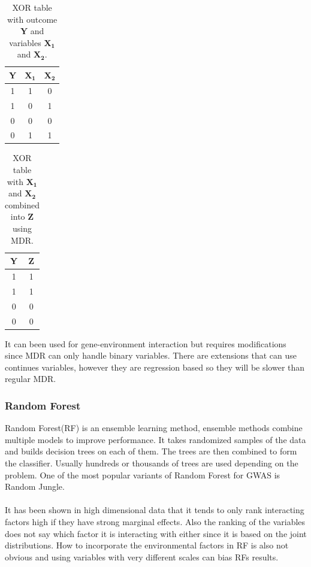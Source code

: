 \documentclass[10pt,a4paper]{article}
\begin{document}
\begin{table}[h]
\begin{tabular}{ | c | c | c | }
  \hline
  \textbf{Y} & $\mathbf{X_1}$ & $\mathbf{X_2}$ \\
  \hline
  1 & 1 & 0 \\
  \hline 
  1 & 0 & 1 \\
  \hline
  0 & 0 & 0 \\
  \hline
  0 & 1 & 1 \\
  \hline
\end{tabular}
\caption{XOR table with outcome $\mathbf{Y}$ and variables $\mathbf{X_1}$ and $\mathbf{X_2}$.}
\label{table:xor_table}
\end{table}
\begin{table}[h]
\begin{tabular}{ | c | c | }
  \hline
  \textbf{Y} & \textbf{Z} \\
  \hline
  1 & 1 \\
  \hline
  1 & 1 \\
  \hline
  0 & 0 \\
  \hline
  0 & 0 \\
  \hline
\end{tabular}
\caption{XOR table with $\mathbf{X_1}$ and $\mathbf{X_2}$ combined into $\mathbf{Z}$ using MDR.}
\label{table:xor_mdr_table}
\end{table}

It can been used for gene-environment interaction but requires modifications since MDR can only handle binary variables. There are extensions that can use continues variables, however they are regression based so they will be slower than regular MDR.\cite{gene_enviroment_2013}

\subsubsection{Random Forest}
Random Forest(RF) is an ensemble learning method, ensemble methods combine multiple models to improve performance. It takes randomized samples of the data and builds decision trees on each of them. The trees are then combined to form the classifier. Usually hundreds or thousands of trees are used depending on the problem\cite{random_forest}. One of the most popular variants of Random Forest for GWAS is Random Jungle\cite{random_jungle}.\\
\\
It has been shown in high dimensional data that it tends to only rank interacting factors high if they have strong marginal effects\cite{winham_rf_2012}. Also the ranking of the variables does not say which factor it is interacting with either since it is based on the joint distributions\cite{gene_enviroment_2013}. How to incorporate the environmental factors in RF is also not obvious and using variables with very different scales can bias RFs results\cite{gene_enviroment_2013}.
\end{document}

